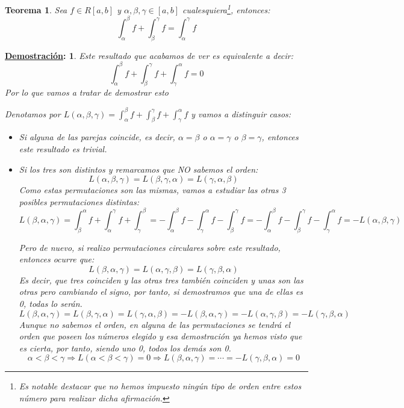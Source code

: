 \documentclass[10pt,a4paper,openright]{book}
\theoremstyle{break}
\newtheorem*{theo}{Teorema}
\newtheorem*{demo}{\underline{Demostración}:}
\begin{document}
\begin{theo}
Sea $f\in R[a,b]$ y $\alpha,\beta,\gamma\in [a,b]$ cualesquiera\footnote{Es notable destacar que no hemos impuesto ningún tipo de orden entre estos número para realizar dicha afirmación.}, entonces:
$$\int_{\alpha}^{\beta} f+ \int_{\beta}^{\gamma} f = \int_{\alpha}^{\gamma} f$$
\end{theo}
\begin{demo}
Este resultado que acabamos de ver es equivalente a decir:
$$\int_{\alpha}^{\beta} f+ \int_{\beta}^{\gamma} f + \int_{\gamma}^{\alpha} f = 0$$
Por lo que vamos a tratar de demostrar esto

Denotamos por $L(\alpha,\beta,\gamma) = \int_{\alpha}^{\beta} f+ \int_{\beta}^{\gamma} f + \int_{\gamma}^{\alpha} f$ y vamos a distinguir casos:
\begin{itemize}
\item Si alguna de las parejas coincide, es decir, $\alpha = \beta$ o $\alpha = \gamma$ o $\beta = \gamma$, entonces este resultado es trivial.

\item Si los tres son distintos y remarcamos que NO sabemos el orden:
$$L(\alpha , \beta , \gamma) = L(\beta , \gamma , \alpha) = L(\gamma , \alpha , \beta)$$
Como estas permutaciones son las mismas, vamos a estudiar las otras 3 posibles permutaciones distintas:
$$L(\beta , \alpha , \gamma) = \int^\alpha_\beta f + \int^\gamma_\alpha f +  \int^\beta_\gamma = - \int^\beta_\alpha f - \int^\alpha_\gamma f - \int^\gamma_\beta f = - \int^\beta_\alpha f - \int^\gamma_\beta f - \int^\alpha_\gamma f   =  -L(\alpha , \beta , \gamma)$$

Pero de nuevo, si realizo permutaciones circulares sobre este resultado, entonces ocurre que:
$$L(\beta , \alpha , \gamma) = L(\alpha , \gamma , \beta) = L(\gamma , \beta , \alpha) $$
Es decir, que tres coinciden y las otras tres también coinciden y unas son las otras pero cambiando el signo, por tanto, si demostramos que una de ellas es 0, todas lo serán.
$$L(\beta , \alpha , \gamma) = L(\beta , \gamma , \alpha) = L(\gamma , \alpha , \beta) = - L(\beta , \alpha , \gamma) = - L(\alpha , \gamma , \beta) = - L(\gamma , \beta , \alpha) $$
Aunque no sabemos el orden, en alguna de las permutaciones se tendrá el orden que poseen los números elegido y esa demostración ya hemos visto que es cierta, por tanto, siendo uno 0, todos los demás son 0.
$$\alpha < \beta < \gamma \Rightarrow L(\alpha < \beta < \gamma ) = 0\Rightarrow L(\beta , \alpha , \gamma) = \cdots  = - L(\gamma , \beta , \alpha) = 0$$
\end{itemize}
\end{demo}
\end{document}
